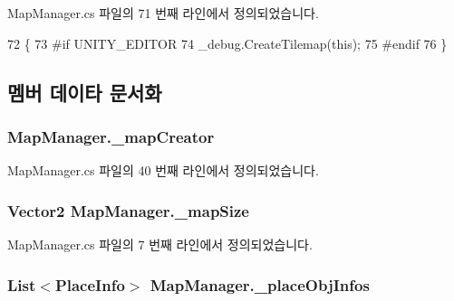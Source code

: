 Map\+Manager.\+cs 파일의 71 번째 라인에서 정의되었습니다.


\begin{DoxyCode}
72     \{
73 \textcolor{preprocessor}{#if UNITY\_EDITOR}
74         \_debug.CreateTilemap(\textcolor{keyword}{this});
75 \textcolor{preprocessor}{#endif}
76     \}
\end{DoxyCode}


\subsection{멤버 데이타 문서화}
\subsubsection[{\texorpdfstring{\+\_\+map\+Creator}{_mapCreator}}]{ Map\+Manager.\+\_\+map\+Creator\hspace{0.3cm}{\ttfamily [private]}}\hypertarget{class_map_manager_aa837a852f355a33b263c1bb07c6c4ece}{}\label{class_map_manager_aa837a852f355a33b263c1bb07c6c4ece}


Map\+Manager.\+cs 파일의 40 번째 라인에서 정의되었습니다.

\subsubsection[{\texorpdfstring{\+\_\+map\+Size}{_mapSize}}]{\setlength{\rightskip}{0pt plus 5cm}Vector2 Map\+Manager.\+\_\+map\+Size\hspace{0.3cm}{\ttfamily [private]}}\hypertarget{class_map_manager_a960f398cc92f569f620ddc8c0140a5c7}{}\label{class_map_manager_a960f398cc92f569f620ddc8c0140a5c7}


Map\+Manager.\+cs 파일의 7 번째 라인에서 정의되었습니다.

\subsubsection[{\texorpdfstring{\+\_\+place\+Obj\+Infos}{_placeObjInfos}}]{\setlength{\rightskip}{0pt plus 5cm}List$<${\bf Place\+Info}$>$ Map\+Manager.\+\_\+place\+Obj\+Infos\hspace{0.3cm}{\ttfamily [private]}}\hypertarget{class_map_manager_ab581d2c754246f74999a0b744ba2b14f}{}\label{class_map_manager_ab581d2c754246f74999a0b744ba2b14f}


